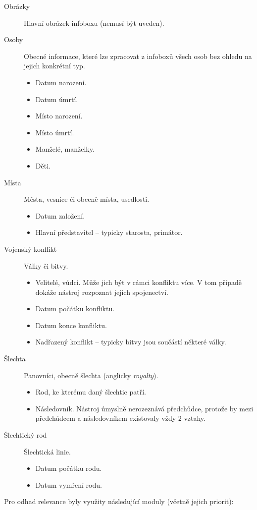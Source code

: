 \begin{description}
	\item[Obrázky] Hlavní obrázek infoboxu (nemusí být uveden).
	\item[Osoby] Obecné informace, které lze zpracovat z infoboxů všech osob bez ohledu na jejich konkrétní typ.
		\begin{itemize}
			\item Datum narození.
			\item Datum úmrtí.
			\item Místo narození.
			\item Místo úmrtí.
			\item Manželé, manželky.
			\item Děti.
		\end{itemize}
	\item[Místa] Města, vesnice či obecně místa, usedlosti.
		\begin{itemize}
			\item Datum založení.
			\item Hlavní představitel -- typicky starosta, primátor.
		\end{itemize}
	\item[Vojenský konflikt] Války či bitvy.
		\begin{itemize}
			\item Velitelé, vůdci. Může jich být v rámci konfliktu více. V tom případě dokáže nástroj rozpoznat jejich spojenectví.
			\item Datum počátku konfliktu.
			\item Datum konce konfliktu.
			\item Nadřazený konflikt -- typicky bitvy jsou součástí některé války.
		\end{itemize}
	\item[Šlechta] Panovníci, obecně šlechta (anglicky \textit{royalty}).
		\begin{itemize}
			\item Rod, ke kterému daný šlechtic patří.
			\item Následovník. Nástroj úmyslně nerozeznává předchůdce, protože by mezi předchůdcem a následovníkem existovaly vždy 2 vztahy.
		\end{itemize}
	\item[Šlechtický rod] Šlechtická linie.
		\begin{itemize}
			\item Datum počátku rodu.
			\item Datum vymření rodu.
		\end{itemize}
\end{description}
\clearpage
Pro odhad relevance byly využity následující moduly (včetně jejich priorit):

